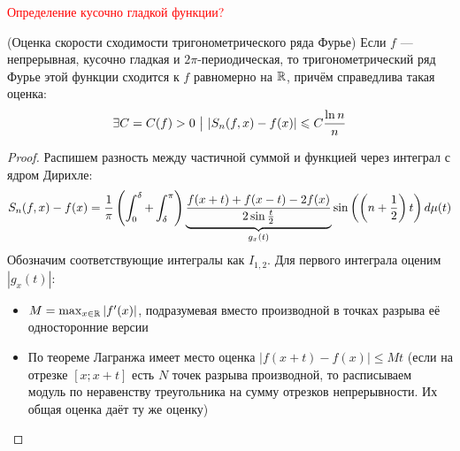 \begin{definition}
	\textcolor{red}{Определение кусочно гладкой функции?}
\end{definition}

\begin{theorem} (Оценка скорости сходимости тригонометрического ряда Фурье)
	Если $f$ --- непрерывная, кусочно гладкая и $2\pi$-периодическая, то тригонометрический ряд Фурье этой функции сходится к $f$ равномерно на $\mathbb{R}$, причём справедлива такая оценка:
	\[
		\exists C = C(f) > 0 \ \big|\  |S_n(f, x) - f(x)| \leqslant C\frac{\ln n}{n}
	\]
\end{theorem}

\begin{proof}
	Распишем разность между частичной суммой и функцией через интеграл с ядром Дирихле:
	\[
		S_n(f, x) - f(x) = \frac{1}{\pi} \left(\int_0^\delta + \int_\delta^\pi\right) \underbrace{\frac{f(x + t) + f(x - t) - 2f(x)}{2\sin\frac{t}{2}}}_{g_x(t)}\sin\left(\left(n + \frac{1}{2}\right)t\right)d\mu(t)
	\]
	Обозначим соответствующие интегралы как $I_{1, 2}$. Для первого интеграла оценим $|g_x(t)|$:
	\begin{itemize}
		\item $M = \max_{x \in \mathbb{R}} |f'(x)|$, подразумевая вместо производной в точках разрыва её односторонние версии
		
		\item По теореме Лагранжа имеет место оценка $|f(x + t) - f(x)| \le Mt$ (если на отрезке $[x; x + t]$ есть $N$ точек разрыва производной, то расписываем модуль по неравенству треугольника на сумму отрезков непрерывности. Их общая оценка даёт ту же оценку)
		

\end{itemize}
\end{proof}
